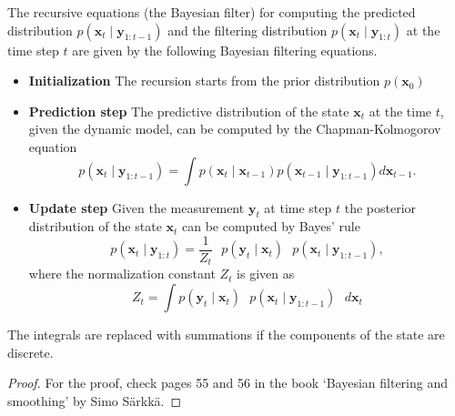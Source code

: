 \begin{theorem}
The recursive equations (the Bayesian filter) for computing the predicted distribution $p(\mathbf{x}_t \mid \mathbf{y}_{1:t-1})$ and the filtering distribution $p(\mathbf{x}_t \mid \mathbf{y}_{1:t})$ at the time step $t$ are given by the following Bayesian filtering equations.
\begin{itemize}
    \item \textbf{Initialization} The recursion starts from the prior distribution $p(\mathbf{x}_0)$
    \item \textbf{Prediction step} The predictive distribution of the state $\mathbf{x}_t$ at the time $t$, given the dynamic model, can be computed by the Chapman-Kolmogorov equation
    \[p(\mathbf{x}_t \mid \mathbf{y}_{1:t-1}) = \int p(\mathbf{x}_t \mid \mathbf{x}_{t-1})p(\mathbf{x}_{t-1} \mid \mathbf{y}_{1:t-1})d\mathbf{x}_{t-1}.\]
    \item \textbf{Update step} Given the measurement $\mathbf{y}_t$ at time step $t$ the posterior distribution of the state $\mathbf{x}_t$ can be computed by Bayes' rule
    \[p(\mathbf{x}_t\mid \mathbf{y}_{1:t}) = \frac{1}{Z_t}\textbf{ }p(\mathbf{y}_t \mid \mathbf{x}_t)\textbf{ }p(\mathbf{x}_t\mid \mathbf{y}_{1:t-1}),\]
    where the normalization constant $Z_t$ is given as 
    \[Z_t = \int p(\mathbf{y}_t \mid \mathbf{x}_t) \textbf{ }p(\mathbf{x}_t\mid \mathbf{y}_{1:t-1}) \textbf{ }d\mathbf{x}_t\]
\end{itemize}
The integrals are replaced with summations if the components of the state are discrete. 
\end{theorem}

\begin{proof}
For the proof, check pages 55 and 56 in the book `Bayesian filtering and smoothing' by Simo Särkkä. 
\end{proof}